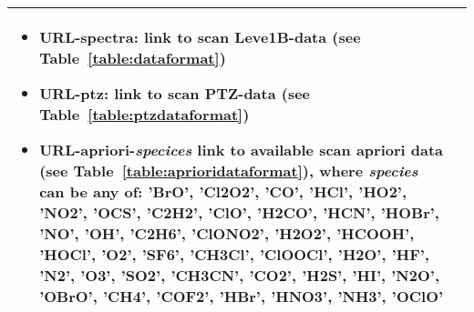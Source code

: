\begin{table}
\begin{longtable}{| p{} | p{} |}
                            \begin{itemize}
                             \item URL-spectra: link to scan Leve1B-data (see Table~\ref{table:dataformat})
                             \item URL-ptz: link to scan PTZ-data (see Table~\ref{table:ptzdataformat})
                             \item URL-apriori-\textit{specices} link to available scan apriori data 
                              (see Table~\ref{table:aprioridataformat}),
                              where \textit{species} can be any of: 'BrO', 'Cl2O2', 'CO', 'HCl', 'HO2', 'NO2',
                              'OCS', 'C2H2', 'ClO', 'H2CO', 'HCN', 'HOBr', 'NO', 'OH', 'C2H6', 'ClONO2', 'H2O2',
                              'HCOOH', 'HOCl', 'O2', 'SF6', 'CH3Cl', 'ClOOCl', 'H2O', 'HF', 'N2', 'O3', 'SO2',
                              'CH3CN', 'CO2', 'H2S', 'HI', 'N2O', 'OBrO', 'CH4', 'COF2', 'HBr', 'HNO3', 'NH3', 'OClO'
                            \end{itemize}
\\ \hline
                                
\hline
\end{longtable}
\end{table}
\addtocounter{table}{-1}
  

\clearpage
\newpage

